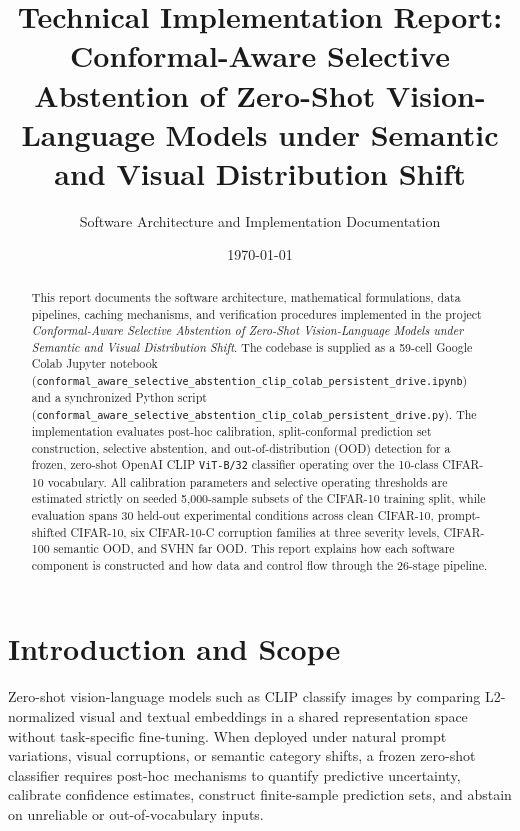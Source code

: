 \documentclass[11pt,a4paper]{article}
\title{\textbf{Technical Implementation Report:\\Conformal-Aware Selective Abstention of Zero-Shot Vision-Language Models under Semantic and Visual Distribution Shift}}
\author{Software Architecture and Implementation Documentation}
\date{\today}
\begin{document}
\maketitle

\begin{abstract}
This report documents the software architecture, mathematical formulations, data pipelines, caching mechanisms, and verification procedures implemented in the project \emph{Conformal-Aware Selective Abstention of Zero-Shot Vision-Language Models under Semantic and Visual Distribution Shift}. The codebase is supplied as a 59-cell Google Colab Jupyter notebook (\texttt{conformal\_\allowbreak{}aware\_\allowbreak{}selective\_\allowbreak{}abstention\_\allowbreak{}clip\_\allowbreak{}colab\_\allowbreak{}persistent\_\allowbreak{}drive.\allowbreak{}ipynb}) and a synchronized Python script (\texttt{conformal\_\allowbreak{}aware\_\allowbreak{}selective\_\allowbreak{}abstention\_\allowbreak{}clip\_\allowbreak{}colab\_\allowbreak{}persistent\_\allowbreak{}drive.\allowbreak{}py}). The implementation evaluates post-hoc calibration, split-conformal prediction set construction, selective abstention, and out-of-distribution (OOD) detection for a frozen, zero-shot OpenAI CLIP \texttt{ViT-B/\allowbreak{}32} classifier operating over the 10-class CIFAR-10 vocabulary. All calibration parameters and selective operating thresholds are estimated strictly on seeded 5,000-sample subsets of the CIFAR-10 training split, while evaluation spans 30 held-out experimental conditions across clean CIFAR-10, prompt-shifted CIFAR-10, six CIFAR-10-C corruption families at three severity levels, CIFAR-100 semantic OOD, and SVHN far OOD. This report explains how each software component is constructed and how data and control flow through the 26-stage pipeline.
\end{abstract}

\tableofcontents
\vspace{10pt}

\section{Introduction and Scope}

Zero-shot vision-language models such as CLIP classify images by comparing L2-normalized visual and textual embeddings in a shared representation space without task-specific fine-tuning. When deployed under natural prompt variations, visual corruptions, or semantic category shifts, a frozen zero-shot classifier requires post-hoc mechanisms to quantify predictive uncertainty, calibrate confidence estimates, construct finite-sample prediction sets, and abstain on unreliable or out-of-vocabulary inputs.
\end{document}
